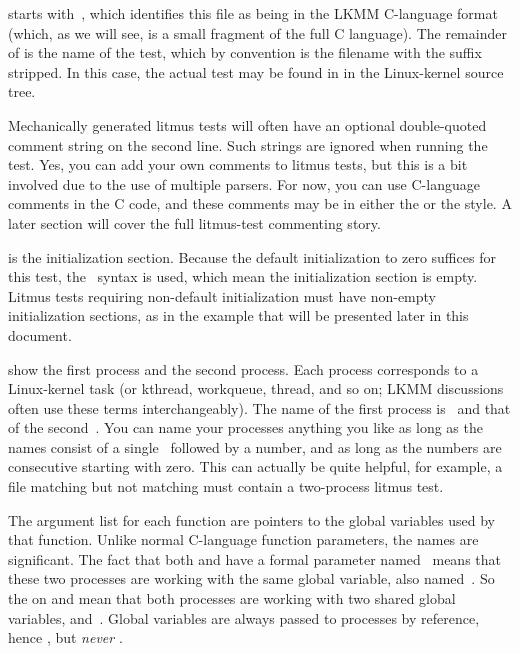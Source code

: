 \begin{fcvref}
 starts with~, which identifies this file as being in the
LKMM C-language format (which, as we will see, is a small fragment
of the full C language).
The remainder of  is the name of the test, which by convention
is the filename with the  suffix stripped.
In this case, the actual test may be found in
in the Linux-kernel source tree.

Mechanically generated litmus tests will often have an optional
double-quoted comment string on the second line.
Such strings are ignored when running the test.
Yes, you can add your own comments to litmus tests, but this is a bit
involved due to the use of multiple parsers.
For now, you can use C-language comments in the C code, and these comments
may be in either the \qco{/* */} or the \qco{//} style.
A later section will cover the full litmus-test commenting story.

 is the initialization section.
Because the default initialization to zero suffices for this test,
the~\qco{\{\}} syntax is used, which mean the initialization section is empty.
Litmus tests requiring non-default initialization must have non-empty
initialization sections, as in the example that will be presented later
in this document.

 show the first process and  the
second process.
Each process corresponds to a Linux-kernel task (or kthread, workqueue, thread,
and so on; LKMM discussions often use these terms interchangeably).
The name of the first process is~ and that of the second~.
You can name your processes anything you like as long as the names consist
of a single~ followed by a number, and as long as the numbers are
consecutive starting with zero.
This can actually be quite helpful, for example, a  file
matching  but not matching  must contain a two-process
litmus test.

The argument list for each function are pointers to the global variables
used by that function.
Unlike normal C-language function parameters, the names are significant.
The fact that both  and  have a formal parameter
named~ means that these two processes are working with the
same global variable, also named~.
So the  on  and  mean that both
processes are working with two shared global variables,  and~.
Global variables are always passed to processes by reference, hence
, but \emph{never} .


\end{fcvref}
